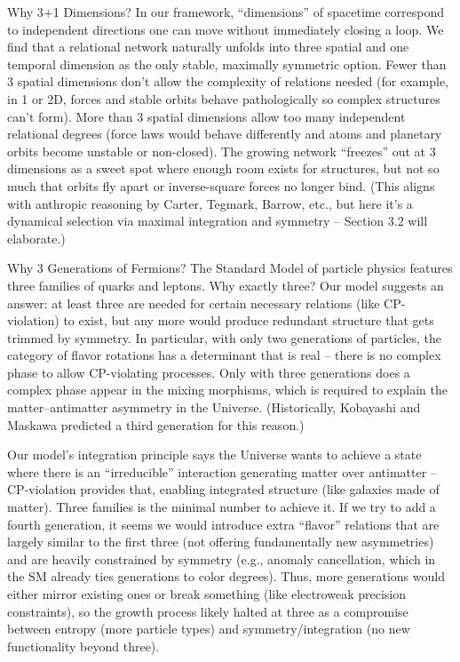 \documentclass{article}
\begin{document}
Why 3+1 Dimensions? In our framework, “dimensions” of spacetime correspond to independent directions one can move without immediately closing a loop. We find that a relational network naturally unfolds into three spatial and one temporal dimension as the only stable, maximally symmetric option. Fewer than 3 spatial dimensions don’t allow the complexity of relations needed (for example, in 1 or 2D, forces and stable orbits behave pathologically so complex structures can’t form\cite{tegmark1997}). More than 3 spatial dimensions allow too many independent relational degrees (force laws would behave differently and atoms and planetary orbits become unstable or non-closed)\cite{tegmark1997}. The growing network “freezes” out at 3 dimensions as a sweet spot where enough room exists for structures, but not so much that orbits fly apart or inverse-square forces no longer bind. (This aligns with anthropic reasoning by Carter, Tegmark, Barrow, etc., but here it’s a dynamical selection via maximal integration and symmetry – Section 3.2 will elaborate.)

Why 3 Generations of Fermions? The Standard Model of particle physics features three families of quarks and leptons. Why exactly three? Our model suggests an answer: at least three are needed for certain necessary relations (like CP-violation) to exist, but any more would produce redundant structure that gets trimmed by symmetry. In particular, with only two generations of particles, the category of flavor rotations has a determinant that is real – there is no complex phase to allow CP-violating processes. Only with three generations does a complex phase appear in the mixing morphisms, which is required to explain the matter–antimatter asymmetry in the Universe\cite{kobayashi1973}. (Historically, Kobayashi and Maskawa predicted a third generation for this reason\cite{kobayashi1973}.)

Our model’s integration principle says the Universe wants to achieve a state where there is an “irreducible” interaction generating matter over antimatter – CP-violation provides that, enabling integrated structure (like galaxies made of matter). Three families is the minimal number to achieve it. If we try to add a fourth generation, it seems we would introduce extra “flavor” relations that are largely similar to the first three (not offering fundamentally new asymmetries) and are heavily constrained by symmetry (e.g., anomaly cancellation, which in the SM already ties generations to color degrees). Thus, more generations would either mirror existing ones or break something (like electroweak precision constraints), so the growth process likely halted at three as a compromise between entropy (more particle types) and symmetry/integration (no new functionality beyond three).
\end{document}
